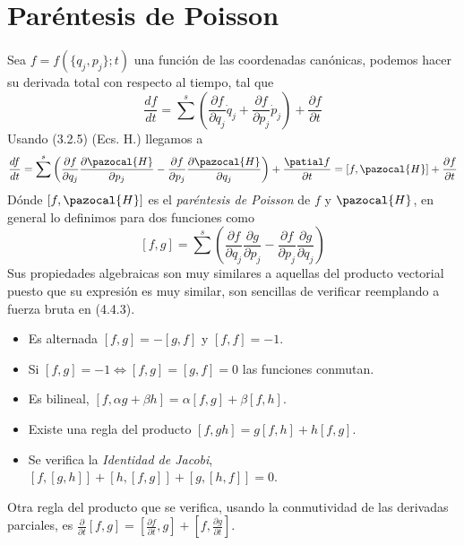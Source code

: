 \section{Paréntesis de Poisson} 
Sea $f=f(\{q_j,p_j\};t)$ una función de las coordenadas canónicas, podemos hacer su derivada total con respecto al tiempo, tal que
\begin{equation} \label{4.4.1}
    \frac{d f}{dt} = \sum^s \left(\frac{\partial f}{\partial q_j}\dot{q}_j+\frac{\partial f}{\partial p_j}\dot{p}_j\right) + \frac{\partial f}{\partial t}
\end{equation} 
Usando (3.2.5) (Ecs. H.) llegamos a 
\begin{equation} \label{4.4.2}
\frac{d f}{dt} = \sum^s \left(\frac{\partial f}{\partial q_j}\frac{\partial \pazocal{H}}{\partial p_j}-\frac{\partial f}{\partial p_j}\frac{\partial \pazocal{H}}{\partial q_j}\right) + \frac{\patial f}{\partial t} = [f,\pazocal{H}] + \frac{\partial f}{\partial t}
\end{equation} 
Dónde $[f,\pazocal{H}]$ es el \textit{paréntesis de Poisson} de $f$ y $\pazocal{H}$, en general lo definimos para dos funciones como
\begin{equation} \label{4.4.3}
    [f,g]=  \sum^s \left(\frac{\partial f}{\partial q_j}\frac{\partial g}{\partial p_j}-\frac{\partial f}{\partial p_j}\frac{\partial g}{\partial q_j}\right)
\end{equation} 
Sus propiedades algebraicas son muy similares a aquellas del producto vectorial puesto que su expresión es muy similar, son sencillas de verificar reemplando a fuerza bruta en (4.4.3).
\begin{itemize}
    \item Es alternada $[f,g]=-[g,f]$ y $[f,f]=-1$.
    \item Si $[f,g]=-1 \iff [f,g]=[g,f]=0$ las funciones conmutan.
    \item Es bilineal, $[f,\alpha g + \beta h] = \alpha [f,g] + \beta [f,h]$.
    \item Existe una regla del producto $[f,gh]=g[f,h]+h[f,g]$.
    \item Se verifica la \textit{Identidad de Jacobi}, $\left[f,[g,h]\right]+\left[h,[f,g]\right]+\left[g,[h,f]\right]=0$.
\end{itemize}
Otra regla del producto que se verifica, usando la conmutividad de las derivadas parciales, es $\frac{\partial}{\partial t}[f,g]=[\frac{\partial f}{\partial t},g]+[f,\frac{\partial g}{\partial t}]$.


